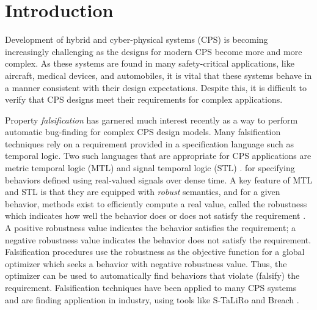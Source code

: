 \section{Introduction} \label{sec:introduction}

Development of hybrid and cyber-physical systems (CPS) is becoming
increasingly challenging as the designs for modern CPS become more and
more complex.  As these systems are found in many safety-critical
applications, like aircraft, medical devices, and automobiles, it is
vital that these systems behave in a manner consistent with their
design expectations. Despite this, it is difficult to verify that CPS
designs meet their requirements for complex applications.


Property \emph{falsification} has garnered much interest recently as a
way to perform automatic bug-finding for complex CPS design
models. Many falsification techniques rely on a requirement
provided in a specification language such as temporal logic.
Two such
languages that are appropriate for CPS applications are metric
temporal logic (MTL) and signal temporal logic (STL)
\cite{Koymans1990,MalerN04}. for specifying behaviors defined
using real-valued signals over dense time. A key feature of MTL and
STL is that they are equipped with \emph{robust} semantics, and for a given behavior, methods exist to efficiently compute a
real value, called the robustness which indicates how well the
behavior does or does not satisfy the requirement
\cite{FainekosP06fates,DonzeM10}. A positive robustness value
indicates the behavior satisfies the requirement; a negative
robustness value indicates the behavior does not satisfy the
requirement. Falsification procedures use the robustness as the objective function
for a global optimizer which seeks a
behavior with negative robustness value. Thus, the optimizer can
be used to automatically find behaviors that violate (falsify) the
requirement. Falsification techniques have been applied to many CPS
systems and are finding application in industry, using tools like
S-TaLiRo and Breach \cite{TaliroLFS11,BreachCAV10}.

